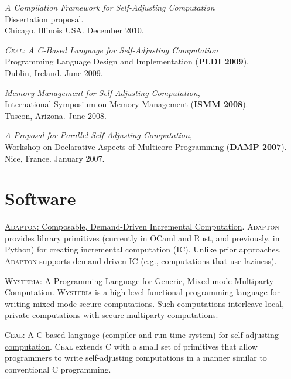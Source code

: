 \documentclass[10pt,letterpaper]{article}
\renewenvironment{itemize}{
  \begin{list}{}{
    \setlength{\leftmargin}{1.5em}
    \setlength{\itemsep}{0.25em}
    \setlength{\parskip}{0pt}
    \setlength{\parsep}{0.25em}
  }
}{
  \end{list}
}
\begin{document}
\begin{itemize}
\item \textit{A Compilation Framework for Self-Adjusting Computation}
\\
Dissertation proposal.
\\
Chicago, Illinois USA. December 2010.

\item \textit{\textsc{Ceal}: A C-Based Language for Self-Adjusting Computation}
\\
Programming Language Design and Implementation (\textbf{PLDI 2009}).
\\
Dublin, Ireland. June 2009.


\item \textit{Memory Management for Self-Adjusting Computation},
\\
International Symposium on Memory Management (\textbf{ISMM 2008}).
\\
Tuscon, Arizona. June 2008.

\item \textit{A Proposal for Parallel Self-Adjusting Computation}, 
\\
Workshop on Declarative Aspects of Multicore Programming (\textbf{DAMP 2007}).
\\
Nice, France. January 2007.

\end{itemize}


\section*{Software}

\begin{itemize}
\item \href{http://adapton.org}{\textsc{Adapton}: Composable, Demand-Driven Incremental Computation}.
  \textsc{Adapton} provides library primitives (currently in OCaml and Rust, and previously, in Python)
  for creating incremental computation (IC).  Unlike prior approaches,
  \textsc{Adapton} supports demand-driven IC (e.g., computations that use
  laziness).

\item \href{https://bitbucket.org/aseemr/wysteria/wiki/Home}{\textsc{Wysteria}: A Programming Language for Generic, Mixed-mode Multiparty Computation}.
  \textsc{Wysteria} is a high-level functional programming language for writing mixed-mode secure computations. Such computations interleave local, private computations with secure multiparty computations.

\item \href{http://ceal.mpi-sws.org}{\textsc{Ceal}: A C-based language (compiler and run-time system) for self-adjusting computation}.
  \textsc{Ceal} extends C with a small set of primitives that allow
  programmers to write self-adjusting computations in a manner similar
  to conventional C programming.
\end{itemize}
\end{document}
